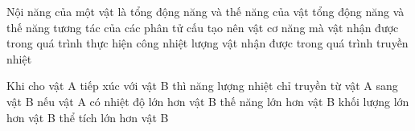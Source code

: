 	\begin{ex}%
		Nội năng của một vật là
		\choice
		{tổng động năng và thế năng của vật}
		{\True tổng động năng và thế năng tương tác của các phân tử cấu tạo nên vật}
		{cơ năng mà vật nhận được trong quá trình thực hiện công}
		{nhiệt lượng vật nhận được trong quá trình truyền nhiệt}
	\end{ex}

	\begin{ex}%
		Khi cho vật A tiếp xúc với vật B thì năng lượng nhiệt chỉ truyền từ vật A sang vật B nếu vật A có
		\choice
		{\True nhiệt độ lớn hơn vật B}
		{thế năng lớn hơn vật B}
		{khối lượng lớn hơn vật B}
		{thể tích lớn hơn vật B}
	\end{ex}

